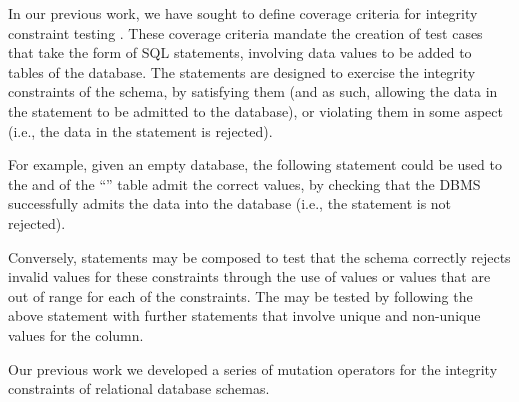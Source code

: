 In our previous work, we have sought to define coverage criteria for integrity constraint testing \cite{McMinn2015}. These coverage criteria mandate the creation of test cases that take the form of SQL \INSERT statements, involving data values to be added to tables of the database. The \INSERT statements are designed to exercise the integrity constraints of the schema, by satisfying them (and as such, allowing the data in the \INSERT statement to be admitted to the database), or violating them in some aspect (i.e., the data in the \INSERT statement is rejected).

For example, given an empty database, the following \INSERT statement could be used to the \NOTNULL and \CCs of the ``'' table admit the correct values, by checking that the DBMS successfully admits the data into the database (i.e., the \INSERT statement is not rejected).

\vspace{-0.5em}
\begin{center}
\end{center}
\vspace{-0.5em}

Conversely, \INSERT statements may be composed to test that the schema correctly rejects invalid values for these constraints through the use of \NULL values or values that are out of range for each of the \CHECK constraints. The \PK may be tested by following the above statement with further \INSERT statements that involve unique and non-unique values for the  column.


Our previous work \cite{Kapfhammer2013,Wright2013,Wright2014} we developed a series of mutation operators for the integrity constraints of relational database schemas. 


